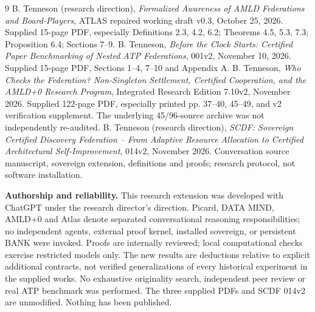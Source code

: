 \documentclass[11pt,letterpaper]{article}
\begin{document}
\begin{thebibliography}{9}\small
{} B. Tenneson (research direction), \emph{Formalized Awareness of AMLD Federations and Board-Players}, ATLAS repaired working draft v0.3, October 25, 2026. Supplied 15-page PDF, especially Definitions 2.3, 4.2, 6.2; Theorems 4.5, 5.3, 7.3; Proposition 6.4; Sections 7--9.
 B. Tenneson, \emph{Before the Clock Starts: Certified Paper Benchmarking of Nested ATP Federations}, 001v2, November 10, 2026. Supplied 15-page PDF, Sections 1--4, 7--10 and Appendix A.
 B. Tenneson, \emph{Who Checks the Federation? Non-Singleton Settlement, Certified Cooperation, and the AMLD+0 Research Program}, Integrated Research Edition 7.10v2, November 2026. Supplied 122-page PDF, especially printed pp. 37--40, 45--49, and v2 verification supplement. The underlying 45/96-source archive was not independently re-audited.
 B. Tenneson (research direction), \emph{SCDF: Sovereign Certified Discovery Federation -- From Adaptive Resource Allocation to Certified Architectural Self-Improvement}, 014v2, November 2026. Conversation source manuscript, sovereign extension, definitions and proofs; research protocol, not software installation.
\end{thebibliography}
\textbf{Authorship and reliability.} This research extension was developed with ChatGPT under the research director's direction. Picard, DATA MIND, AMLD+0 and Atlas denote separated conversational reasoning responsibilities; no independent agents, external proof kernel, installed sovereign, or persistent BANK were invoked. Proofs are internally reviewed; local computational checks exercise restricted models only. The new results are deductions relative to explicit additional contracts, not verified generalizations of every historical experiment in the supplied works. No exhaustive originality search, independent peer review or real ATP benchmark was performed. The three supplied PDFs and SCDF 014v2 are unmodified. Nothing has been published.
\end{document}
